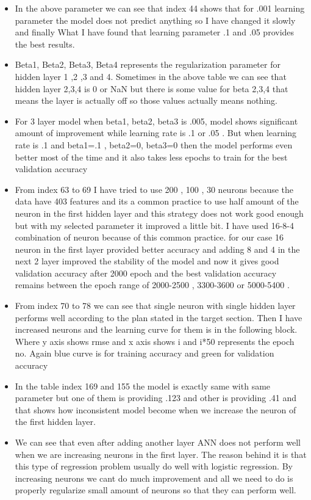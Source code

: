 \documentclass[11pt, a4paper , landscape]{article}
\begin{document}
\begin{itemize}
\item
  In the above parameter we can see that index 44 shows that for .001
  learning parameter the model does not predict anything so I have
  changed it slowly and finally What I have found that learning
  parameter .1 and .05 provides the best results.
\item
  Beta1, Beta2, Beta3, Beta4 represents the regularization parameter for
  hidden layer 1 ,2 ,3 and 4. Sometimes in the above table we can see
  that hidden layer 2,3,4 is 0 or NaN but there is some value for beta
  2,3,4 that means the layer is actually off so those values actually
  means nothing.
\item
  For 3 layer model when beta1, beta2, beta3 is .005, model shows
  significant amount of improvement while learning rate is .1 or .05 .
  But when learning rate is .1 and beta1=.1 , beta2=0, beta3=0 then the
  model performs even better most of the time and it also takes less
  epochs to train for the best validation accuracy
\item
  From index 63 to 69 I have tried to use 200 , 100 , 30 neurons because
  the data have 403 features and its a common practice to use half
  amount of the neuron in the first hidden layer and this strategy does
  not work good enough but with my selected parameter it improved a
  little bit. I have used 16-8-4 combination of neuron because of this
  common practice. for our case 16 neuron in the first layer provided
  better accuracy and adding 8 and 4 in the next 2 layer improved the
  stability of the model and now it gives good validation accuracy after
  2000 epoch and the best validation accuracy remains between the epoch
  range of 2000-2500 , 3300-3600 or 5000-5400 .
\item
  From index 70 to 78 we can see that single neuron with single hidden
  layer performs well according to the plan stated in the target
  section. Then I have increased neurons and the learning curve for them
  is in the following block. Where y axis shows rmse and x axis shows i
  and i*50 represents the epoch no. Again blue curve is for training
  accuracy and green for validation accuracy
\item
  In the table index 169 and 155 the model is exactly same with same
  parameter but one of them is providing .123 and other is providing .41
  and that shows how inconsistent model become when we increase the
  neuron of the first hidden layer.
\item
  We can see that even after adding another layer ANN does not perform
  well when we are increasing neurons in the first layer. The reason
  behind it is that this type of regression problem usually do well with
  logistic regression. By increasing neurons we cant do much improvement
  and all we need to do is properly regularize small amount of neurons
  so that they can perform well.
\end{itemize}
\end{document}
